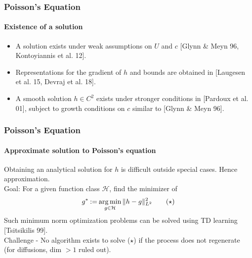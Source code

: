 \documentclass[xcolor=dvipsnames, subsection=false]{beamer}
\def\alertb#1{\alert{\color{BrickRed}  #1}}
\def\alertb#1{\alert{\color{BrickRed}  #1}}
\def\clH{{\mathcal H}}
\def\argmin{\mathop{\rm arg\, min}}
\def\eqdef{\mathbin{:=}}
\newcommand{\pot}{U}
\def\bl#1{{\color{blue}#1}}
\begin{document}
\begin{frame}
\frametitle{Poisson's Equation}
\framesubtitle{Existence of a solution}
\begin{itemize}
\item A solution exists under weak assumptions on $\pot$ and $c$ \bl{\footnotesize{[Glynn \& Meyn 96, Kontoyiannis et al. 12]}}.
\item Representations for the gradient of $h$ and bounds are obtained in \bl{\footnotesize{[Laugesen et al. 15, Devraj et al. 18]}}.
\item A smooth solution $h\in C^2$ exists under stronger conditions in \bl{\footnotesize{[Pardoux et al. 01]}}, subject to growth conditions on $c$ similar to \bl{\footnotesize{[Glynn \& Meyn 96]}}.
\end{itemize}
\end{frame}

\begin{frame}
\frametitle{Poisson's Equation}
\framesubtitle{Approximate solution to Poisson's equation}
Obtaining an analytical solution for $h$ is difficult outside special cases. Hence approximation.\\[0.5cm] \pause
Goal: For a given function class $\clH$, find the minimizer of
\[
g^* \eqdef \argmin_{g \in \clH} \|h - g\|^2_{L^2}  \tag{$\star$}
\label{e:lstd1}
\]
Such minimum norm optimization problems can be solved using \alertb{TD learning} {\footnotesize \bl{[Tsitsikilis 99]}}.\\[0.5cm] \pause
\alertb{Challenge - No algorithm exists to solve ($\star$) if the process does not regenerate (for diffusions, dim $>1$ ruled out)}.
\end{frame}
\end{document}
